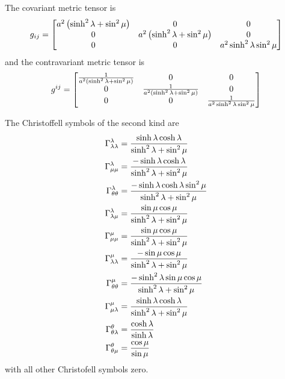 The covariant metric tensor is
\begin{equation}
  g_{ij}=\begin{bmatrix}
    a^{2}\left( \sinh^{2}\lambda+\sin^{2}\mu \right) & 0 & 0 \\
    0 & a^{2}\left( \sinh^{2}\lambda+\sin^{2}\mu \right) & 0 \\
    0 & 0 & a^{2}\sinh^{2}\lambda\sin^{2}\mu 
  \end{bmatrix}
\end{equation}
and the contravariant metric tensor is
\begin{equation}
  g^{ij}=\begin{bmatrix}
    \frac{1}{a^{2}\left( \sinh^{2}\lambda+\sin^{2}\mu \right)}& 0 & 0 \\
    0 & \frac{1}{a^{2}\left( \sinh^{2}\lambda+\sin^{2}\mu \right)} & 0 \\
    0 & 0 & \frac{1}{a^{2}\sinh^{2}\lambda\sin^{2}\mu} 
  \end{bmatrix}
\end{equation}

The Christoffell symbols of the second kind are
\begin{align}
   \Gamma^{\lambda}_{\lambda\lambda} &=\frac{\sinh\lambda\cosh\lambda}{\sinh^{2}\lambda+\sin^{2}\mu} \\
   \Gamma^{\lambda}_{\mu\mu} &=\frac{-\sinh\lambda\cosh\lambda}{\sinh^{2}\lambda+\sin^{2}\mu} \\
   \Gamma^{\lambda}_{\theta\theta} &=\frac{-\sinh\lambda\cosh\lambda\sin^{2}\mu}{\sinh^{2}\lambda+\sin^{2}\mu} \\
   \Gamma^{\lambda}_{\lambda\mu} &=\frac{\sin\mu\cos\mu}{\sinh^{2}\lambda+\sin^{2}\mu} \\
   \Gamma^{\mu}_{\mu\mu} &=\frac{\sin\mu\cos\mu}{\sinh^{2}\lambda+\sin^{2}\mu} \\
   \Gamma^{\mu}_{\lambda\lambda} &=\frac{-\sin\mu\cos\mu}{\sinh^{2}\lambda+\sin^{2}\mu} \\
   \Gamma^{\mu}_{\theta\theta} &=\frac{-\sinh^{2}\lambda\sin\mu\cos\mu}{\sinh^{2}\lambda+\sin^{2}\mu} \\
   \Gamma^{\mu}_{\mu\lambda} &=\frac{\sinh\lambda\cosh\lambda}{\sinh^{2}\lambda+\sin^{2}\mu} \\
   \Gamma^{\theta}_{\theta\lambda} &=\frac{\cosh\lambda}{\sinh\lambda} \\
   \Gamma^{\theta}_{\theta\mu} &=\frac{\cos\mu}{\sin\mu} \\
 \end{align}
with all other Christofell symbols zero.

